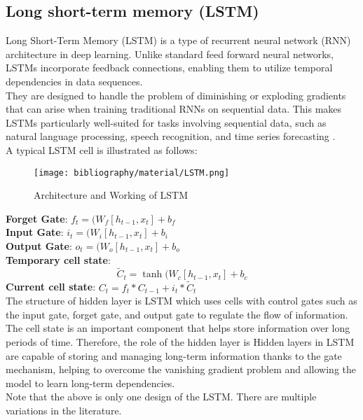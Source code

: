 \documentclass{ieeeojies}
\begin{document}
	\subsection{Long short-term memory (LSTM)}
	Long Short-Term Memory (LSTM) is a type of recurrent neural network (RNN) architecture in deep learning. Unlike standard feed forward neural networks, LSTMs incorporate feedback connections, enabling them to utilize temporal dependencies in data sequences.\\ 
	They are designed to handle the problem of diminishing or exploding gradients that can arise when training traditional RNNs on sequential data. This makes LSTMs particularly well-suited for tasks involving sequential data, such as natural language processing, speech recognition, and time series forecasting \cite{b13}.\\
        A typical LSTM cell is illustrated as follows:
	\begin{figure}[H] %
		\centering
		\texttt{[image: bibliography/material/LSTM.png]}
		\caption{Architecture and Working of LSTM}
	\end{figure}
	\noindent \textbf{Forget Gate}: $f_t = (W_f[h_{t-1}, x_t] + b_f$ \\
	\textbf{Input Gate}: $i_t = (W_i[h_{t-1}, x_t] + b_i$ \\
	\textbf{Output Gate}: $o_t = (W_o[h_{t-1}, x_t] + b_o$\\
	\textbf{Temporary cell state}: \[\tilde{C}_t = \tanh(W_c[h_{t-1}, x_t] + b_c\]
	\textbf{Current cell state}: $C_t = f_t * C_{t-1} + i_t * \tilde{C}_t$ \cite{b14}\\
        The structure of hidden layer is LSTM which uses cells with control gates such as the input gate, forget gate, and output gate to regulate the flow of information. The cell state is an important component that helps store information over long periods of time. Therefore, the role of the hidden layer is Hidden layers in LSTM are capable of storing and managing long-term information thanks to the gate mechanism, helping to overcome the vanishing gradient problem and allowing the model to learn long-term dependencies.\\
        Note that the above is only one design of the LSTM.
        There are multiple variations in the literature. 
	
\end{document}
